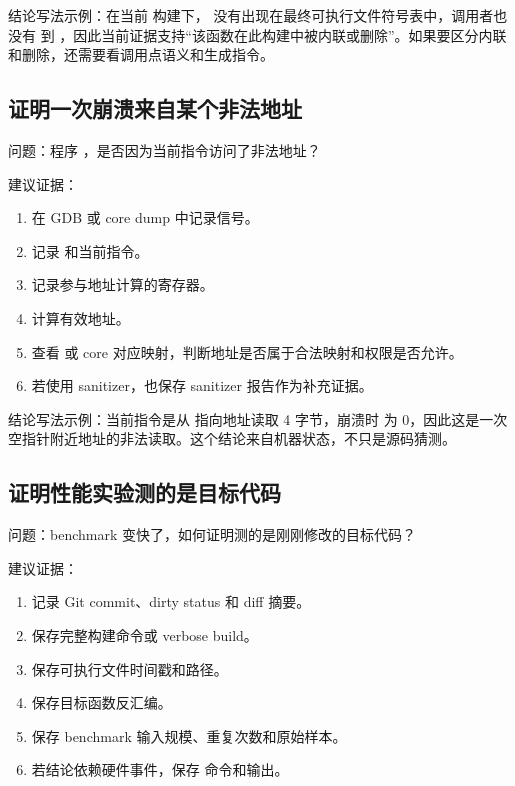 结论写法示例：在当前  构建下， 没有出现在最终可执行文件符号表中，调用者也没有  到 ，因此当前证据支持“该函数在此构建中被内联或删除”。如果要区分内联和删除，还需要看调用点语义和生成指令。

\subsection{证明一次崩溃来自某个非法地址}

问题：程序 ，是否因为当前指令访问了非法地址？

建议证据：

\begin{enumerate}
  \item 在 GDB 或 core dump 中记录信号。
  \item 记录  和当前指令。
  \item 记录参与地址计算的寄存器。
  \item 计算有效地址。
  \item 查看  或 core 对应映射，判断地址是否属于合法映射和权限是否允许。
  \item 若使用 sanitizer，也保存 sanitizer 报告作为补充证据。
\end{enumerate}

结论写法示例：当前指令是从  指向地址读取 4 字节，崩溃时  为 0，因此这是一次空指针附近地址的非法读取。这个结论来自机器状态，不只是源码猜测。

\subsection{证明性能实验测的是目标代码}

问题：benchmark 变快了，如何证明测的是刚刚修改的目标代码？

建议证据：

\begin{enumerate}
  \item 记录 Git commit、dirty status 和 diff 摘要。
  \item 保存完整构建命令或 verbose build。
  \item 保存可执行文件时间戳和路径。
  \item 保存目标函数反汇编。
  \item 保存 benchmark 输入规模、重复次数和原始样本。
  \item 若结论依赖硬件事件，保存  命令和输出。
\end{enumerate}

